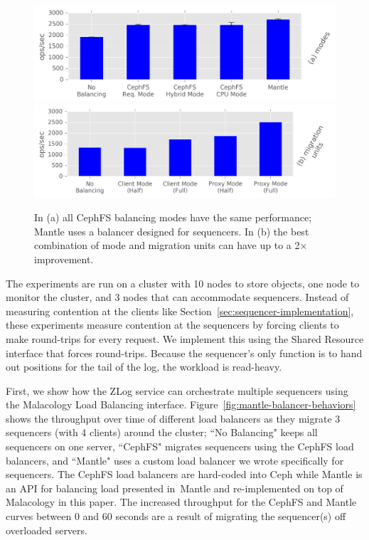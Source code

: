\begin{figure}[t!]
\centering
\includegraphics{figures/mantle-balancer-performance.png}
\includegraphics{figures/mantle-mode-performance.png}
\caption{In (a) all CephFS balancing modes have the same performance; Mantle
uses a balancer designed for sequencers. In (b) the best combination of mode
and migration units can have up to a 2\(\times\)
improvement.}\label{fig:mantle-balancer-performance}
\end{figure}

The experiments are run on a cluster with 10 nodes to store objects, one node
to monitor the cluster, and 3 nodes that can accommodate sequencers.  Instead
of measuring contention at the clients like
Section~\ref{sec:sequencer-implementation}, these experiments measure
contention at the sequencers by forcing clients to make round-trips for every
request. We implement this using the Shared Resource interface that forces
round-trips.  Because the sequencer's only function is to  hand out positions
for the tail of the log, the workload is read-heavy.

First, we show how the ZLog service can orchestrate multiple sequencers using
the Malacology Load Balancing interface.
Figure~\ref{fig:mantle-balancer-behaviors} shows the throughput over time of
different load balancers as they migrate 3 sequencers (with 4 clients) around
the cluster; ``No Balancing" keeps all sequencers on one server, ``CephFS"
migrates sequencers using the CephFS load balancers, and ``Mantle" uses a
custom load balancer we wrote specifically for sequencers. The CephFS load
balancers are hard-coded into Ceph while Mantle is an API for balancing load
presented in~Mantle and re-implemented on top of
Malacology in this paper.  The increased throughput for the CephFS and Mantle
curves between 0 and 60 seconds are a result of migrating the sequencer(s) off
overloaded servers.

